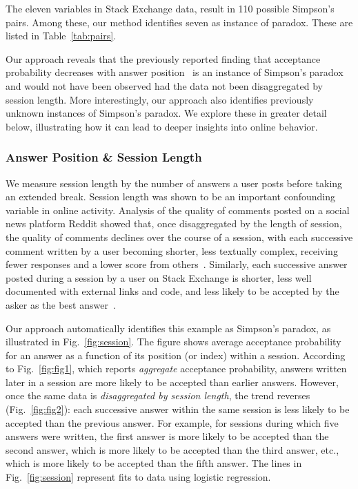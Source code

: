 The eleven variables in Stack Exchange data, result in 110 possible Simpson's pairs. %
Among these, our method identifies seven as instance of paradox. These are listed in Table~\ref{tab:pairs}.

Our approach reveals that the previously reported finding that acceptance probability decreases with answer position~\cite{Ferrara2017dynamics} is an instance of Simpson's paradox and would not have been observed  had the data not been disaggregated by session length. More interestingly, our approach also identifies previously unknown instances of Simpson's paradox.  We explore these in greater detail below, illustrating how it  can lead to deeper insights into online behavior.

\subsubsection{Answer Position \& Session Length}

We measure session length by the number of answers a user posts before taking an extended break.
Session length was shown to be an important confounding variable in online activity. Analysis of the quality of comments posted on a social news platform Reddit showed that, once disaggregated by the length of session, the quality of comments declines over the course of a session, with each successive comment written by a user becoming shorter, less textually complex, receiving fewer responses and a lower score from others~\cite{Singer2016plosone}. Similarly, each successive answer posted during a session by a user on Stack Exchange is shorter, less well documented with external links and code, and  less likely to be accepted by the asker as the best answer~\cite{Ferrara2017dynamics}. %


Our approach automatically identifies this example as Simpson's paradox, as illustrated in Fig.~\ref{fig:session}. The figure shows average acceptance probability for an answer as a function of its position (or index) within a session. According to Fig.~\ref{fig:fig1}, which reports \emph{aggregate} acceptance probability, answers written later in a session are more likely to be accepted than earlier answers. However, once the same data is \emph{disaggregated by session length}, the trend reverses (Fig.~\ref{fig:fig2}): each successive answer within the same session is less likely to be accepted than the previous answer. For example, for sessions during which five answers were written, the first answer is more likely to be accepted than the second answer, which is more likely to be accepted than the third answer, etc., which is more likely to be accepted than the fifth answer.
The lines in Fig.~\ref{fig:session}  represent fits to data using logistic regression.

